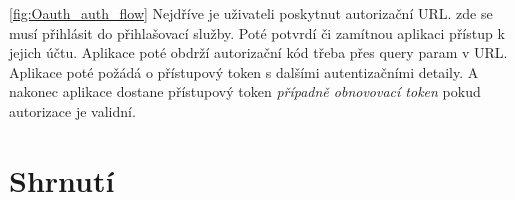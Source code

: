 \ref{fig:Oauth_auth_flow} Nejdříve je uživateli poskytnut autorizační URL. zde se musí přihlásit do přihlašovací služby. Poté potvrdí či zamítnou aplikaci přístup k jejich účtu. Aplikace poté obdrží autorizační kód třeba přes query param %
v URL. Aplikace poté požádá o přístupový token s dalšími autentizačními detaily. A nakonec aplikace dostane přístupový token \textit{případně obnovovací token} pokud autorizace je validní.

\section{Shrnutí}


